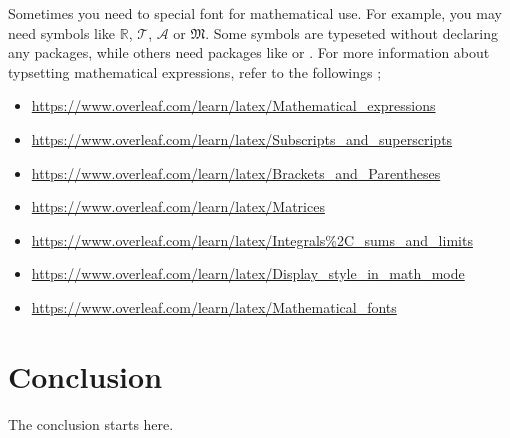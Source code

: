 Sometimes you need to special font for mathematical use.
For example, you may need symbols like \(\mathbb R\), \(\mathcal T\), \(\mathscr A\) or \(\mathfrak M\).
Some symbols are typeseted without declaring any packages, while others need packages like  or .
For more information about typsetting mathematical expressions, refer to the followings ;

\small

\begin{itemize}
\item
\url{https://www.overleaf.com/learn/latex/Mathematical_expressions}
\item
\url{https://www.overleaf.com/learn/latex/Subscripts_and_superscripts}
\item
\url{https://www.overleaf.com/learn/latex/Brackets_and_Parentheses}
\item
\url{https://www.overleaf.com/learn/latex/Matrices}
\item
\url{https://www.overleaf.com/learn/latex/Integrals\%2C_sums_and_limits}
\item
\url{https://www.overleaf.com/learn/latex/Display_style_in_math_mode}
\item
\url{https://www.overleaf.com/learn/latex/Mathematical_fonts}
\end{itemize}

\normalsize




\chapter{Conclusion}\label{chap:conclusion}
The conclusion starts here.
